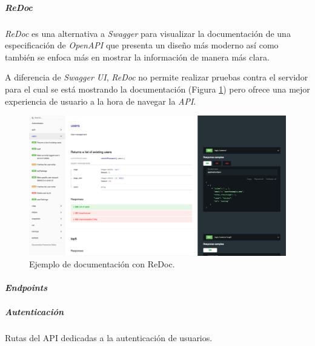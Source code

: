 \documentclass[12pt,a4paper,]{scrartcl}
\let\oldparagraph\paragraph
\renewcommand{\paragraph}[1]{\oldparagraph{#1}\mbox{}}
\let\oldsubparagraph\subparagraph
\renewcommand{\subparagraph}[1]{\oldsubparagraph{#1}\mbox{}}
\begin{document}
\hypertarget{redoc}{%
\subparagraph{\texorpdfstring{\emph{ReDoc}}{ReDoc}}\label{redoc}}

\emph{ReDoc} es una alternativa a \emph{Swagger} para visualizar la documentación de una especificación de \emph{OpenAPI} que presenta un diseño más moderno así como también se enfoca más en mostrar la información de manera más clara.

A diferencia de \emph{Swagger UI}, \emph{ReDoc} no permite realizar pruebas contra el servidor para el cual se está mostrando la documentación (Figura \ref{fig:logic-redoc-main}) pero ofrece una mejor experiencia de usuario a la hora de navegar la \emph{API}.

\begin{figure}[H]

{\centering \includegraphics{assets/logic/redoc-main.pdf} 

}

\caption{Ejemplo de documentación con ReDoc.}\label{fig:logic-redoc-main}
\end{figure}

\hypertarget{endpoints}{%
\paragraph{\texorpdfstring{\emph{Endpoints}}{Endpoints}}\label{endpoints}}

\hypertarget{autenticaciuxf3n}{%
\subparagraph{Autenticación}\label{autenticaciuxf3n}}

Rutas del API dedicadas a la autenticación de usuarios.
\end{document}
